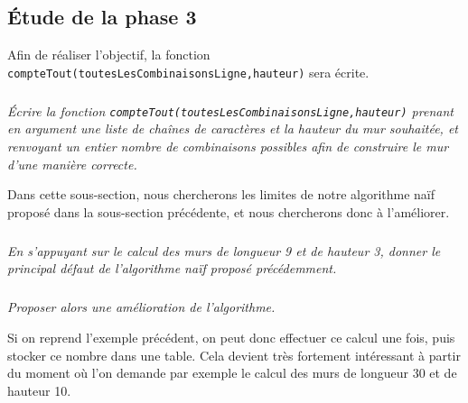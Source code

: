 \subsection{\'Etude de la phase 3}
Afin de réaliser l'objectif, la fonction \texttt{compteTout(toutesLesCombinaisonsLigne,hauteur)} sera écrite. 


\subparagraph{}\textit{\'Ecrire la fonction \texttt{compteTout(toutesLesCombinaisonsLigne,hauteur)} prenant en argument une liste de chaînes de caractères et la hauteur du mur souhaitée, et renvoyant un entier nombre de combinaisons possibles afin de construire le mur d'une manière correcte.}


Dans cette sous-section, nous chercherons les limites de notre algorithme naïf proposé dans la sous-section précédente, et nous chercherons donc à l'améliorer.

\subparagraph{}\textit{En s'appuyant sur le calcul des murs de longueur 9 et de hauteur 3, donner le principal défaut de l'algorithme naïf proposé précédemment.}




\subparagraph{}\textit{Proposer alors une amélioration de l'algorithme.}


\ifprof
Si on reprend l'exemple précédent, on peut donc effectuer
ce calcul une fois, puis stocker ce nombre dans une table. Cela devient très fortement intéressant à partir du moment où l'on demande par exemple le calcul des murs de longueur 30 et de hauteur 10.
\else
\fi
%
